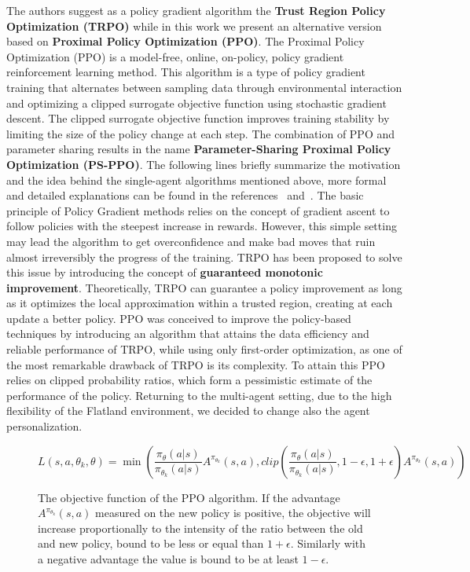 \documentclass[11pt, a4paper, hidelinks]{report}
\begin{document}
The authors suggest as a policy gradient algorithm the \textbf{Trust Region Policy Optimization (TRPO)} while in this work we present an alternative version based on \textbf{Proximal Policy Optimization (PPO)}.
The Proximal Policy Optimization (PPO) is a model-free, online, on-policy, policy gradient reinforcement learning method.
This algorithm is a type of policy gradient training that alternates between sampling data through environmental interaction and optimizing a clipped surrogate objective function using stochastic gradient descent.
The clipped surrogate objective function improves training stability by limiting the size of the policy change at each step.
The combination of PPO and parameter sharing results in the name \textbf{Parameter-Sharing Proximal Policy Optimization (PS-PPO)}.
The following lines briefly summarize the motivation and the idea behind the single-agent algorithms mentioned above, more formal and detailed explanations can be found in the references~\citep{trpo} and~\citep{ppo}.
The basic principle of Policy Gradient methods relies on the concept of gradient ascent to follow policies with the steepest increase in rewards.
However, this simple setting may lead the algorithm to get overconfidence and make bad moves that ruin almost irreversibly the progress of the training.
TRPO has been proposed to solve this issue by introducing the concept of \textbf{guaranteed monotonic improvement}.
Theoretically, TRPO can guarantee a policy improvement as long as it optimizes the local approximation within a trusted region, creating at each update a better policy.
PPO was conceived to improve the policy-based techniques by introducing an algorithm that attains the data efficiency and reliable performance of TRPO, while using only first-order optimization, as one of the most remarkable drawback of TRPO is its complexity.
To attain this PPO relies on clipped probability ratios, which form a pessimistic estimate of the performance of the policy.
Returning to the multi-agent setting, due to the high flexibility of the Flatland environment, we decided to change also the agent personalization.
\begin{figure}
	\[ L(s, a, \theta_{k}, \theta) = \min\left(\frac{\pi_{\theta}(a|s)}{\pi_{\theta_{k}}(a|s)}A^{\pi_{\theta_{k}}}(s, a), clip\left(\frac{\pi_{\theta}(a|s)}{\pi_{\theta_{k}}(a|s)}, 1 - \epsilon, 1 + \epsilon\right)A^{\pi_{\theta_{k}}}(s, a)\right)\]
	\caption{The objective function of the PPO algorithm. If the advantage $A^{\pi_{\theta_{k}}}(s, a)$ measured on the new policy is positive, the objective will increase proportionally to the intensity of the ratio between the old and new policy, bound to be less or equal than $1 + \epsilon$. Similarly with a negative advantage the value is bound to be at least $1 - \epsilon$.}\label{fig:ppo_objective}
\end{figure}
\end{document}
